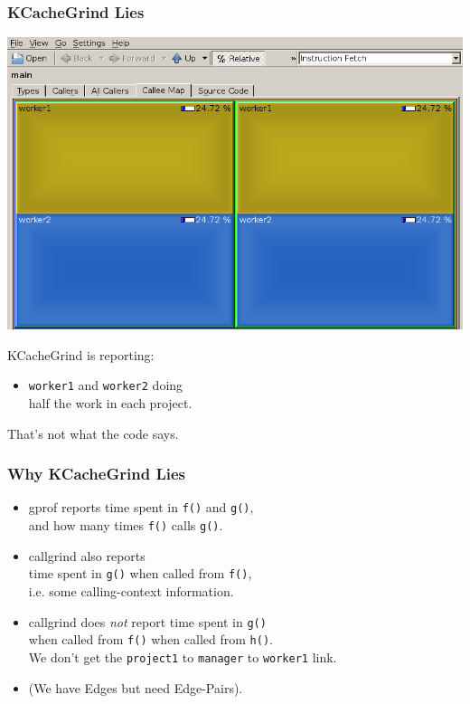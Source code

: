 \begin{frame}
  \frametitle{KCacheGrind Lies}
  \begin{center}
    \includegraphics[width=.5\textwidth]{images/kcachegrind2-top}
  \end{center}
  
    KCacheGrind is reporting:
    \begin{itemize}
    \item {\tt worker1} and {\tt worker2} doing \\
      half the work in each project.
    \end{itemize}
    That's not what the code says.
  
\end{frame}

\begin{frame}
  \frametitle{Why KCacheGrind Lies}

  \begin{itemize}
  \item gprof reports time spent in {\tt f()} and {\tt g()},\\
    and how many times {\tt f()} calls {\tt g()}.
  \item callgrind also reports \\
     time spent  in {\tt g()}
     when called from {\tt f()}, \\
     i.e. some calling-context information.\\[1em]
   \item callgrind does \emph{not} report time spent in {\tt g()} \\
     when
     called from {\tt f()} when called from {\tt h()}.\\[1em]
     We don't get the {\tt project1} to {\tt manager} to {\tt worker1} link.\\[1em]
     \item (We have Edges but need Edge-Pairs).
     \end{itemize}
  
\end{frame}

